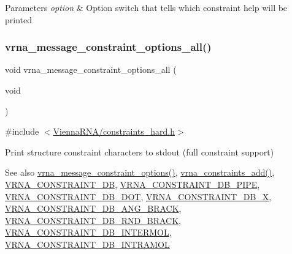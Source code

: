 \begin{DoxyParams}{Parameters}
{\em option} & Option switch that tells which constraint help will be printed \\
\hline
\end{DoxyParams}
\mbox{\label{group__constraints_gaec7e13fa0465c2acc7a621d1aecb709f}} 
\subsubsection{\texorpdfstring{vrna\+\_\+message\+\_\+constraint\+\_\+options\+\_\+all()}{vrna\_message\_constraint\_options\_all()}}
{\footnotesize\ttfamily void vrna\+\_\+message\+\_\+constraint\+\_\+options\+\_\+all (\begin{DoxyParamCaption}\item[{void}]{ }\end{DoxyParamCaption})}



{\ttfamily \#include $<$\hyperlink{constraints__hard_8h}{Vienna\+R\+N\+A/constraints\+\_\+hard.\+h}$>$}



Print structure constraint characters to stdout (full constraint support) 

\begin{DoxySeeAlso}{See also}
\hyperlink{group__constraints_gaa1f20b53bf09ac2e6b0dbb13f7d89670}{vrna\+\_\+message\+\_\+constraint\+\_\+options()}, \hyperlink{group__constraints_ga35a401f680969a556858a8dd5f1d07cc}{vrna\+\_\+constraints\+\_\+add()}, \hyperlink{group__hard__constraints_ga4bfc2f15c4f261c62a11af9d2aa80c90}{V\+R\+N\+A\+\_\+\+C\+O\+N\+S\+T\+R\+A\+I\+N\+T\+\_\+\+DB}, \hyperlink{group__hard__constraints_ga13053547a2de5532b64b64d35e097ae1}{V\+R\+N\+A\+\_\+\+C\+O\+N\+S\+T\+R\+A\+I\+N\+T\+\_\+\+D\+B\+\_\+\+P\+I\+PE}, \hyperlink{group__hard__constraints_ga369bea82eae75fbe626f409fa425747e}{V\+R\+N\+A\+\_\+\+C\+O\+N\+S\+T\+R\+A\+I\+N\+T\+\_\+\+D\+B\+\_\+\+D\+OT}, \hyperlink{group__hard__constraints_ga7283bbe0f8954f7b030ecc3f2d1932b2}{V\+R\+N\+A\+\_\+\+C\+O\+N\+S\+T\+R\+A\+I\+N\+T\+\_\+\+D\+B\+\_\+X}, \hyperlink{constraints__hard_8h_ad54c1315a47d55653dcaa5de6e544b77}{V\+R\+N\+A\+\_\+\+C\+O\+N\+S\+T\+R\+A\+I\+N\+T\+\_\+\+D\+B\+\_\+\+A\+N\+G\+\_\+\+B\+R\+A\+CK}, \hyperlink{group__hard__constraints_gac17b034852c914bc5879954c65d7e74b}{V\+R\+N\+A\+\_\+\+C\+O\+N\+S\+T\+R\+A\+I\+N\+T\+\_\+\+D\+B\+\_\+\+R\+N\+D\+\_\+\+B\+R\+A\+CK}, \hyperlink{group__hard__constraints_ga31d0ebb9755ca8a4acafc14f00ca755d}{V\+R\+N\+A\+\_\+\+C\+O\+N\+S\+T\+R\+A\+I\+N\+T\+\_\+\+D\+B\+\_\+\+I\+N\+T\+E\+R\+M\+OL}, \hyperlink{group__hard__constraints_ga5c17253f5a39d1d49b0fb11f5196982a}{V\+R\+N\+A\+\_\+\+C\+O\+N\+S\+T\+R\+A\+I\+N\+T\+\_\+\+D\+B\+\_\+\+I\+N\+T\+R\+A\+M\+OL} 
\end{DoxySeeAlso}
